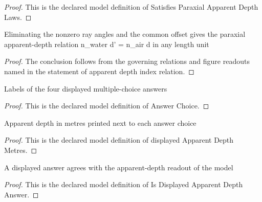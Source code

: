 \begin{proof}
  This is the declared model definition of Satisfies Paraxial Apparent Depth Laws.
\end{proof}
\begin{lemma}
  \label{lem:physics:phyx-mini-0137:phyxminiproblems-problemphyxmini0137-apparent-depth-index-relation}
  Eliminating the nonzero ray angles and the common offset gives the paraxial apparent-depth relation n\_water d' = n\_air d in any length unit
\end{lemma}
\begin{proof}
  The conclusion follows from the governing relations and figure readouts named in the statement of apparent depth index relation.
\end{proof}
\begin{definition}
  \label{def:physics:phyx-mini-0137:phyxminiproblems-problemphyxmini0137-answerchoice}
  Labels of the four displayed multiple-choice answers
\end{definition}
\begin{proof}
  This is the declared model definition of Answer Choice.
\end{proof}
\begin{definition}
  \label{def:physics:phyx-mini-0137:phyxminiproblems-problemphyxmini0137-displayedapparentdepthmetres}
  Apparent depth in metres printed next to each answer choice
\end{definition}
\begin{proof}
  This is the declared model definition of displayed Apparent Depth Metres.
\end{proof}
\begin{definition}
  \label{def:physics:phyx-mini-0137:phyxminiproblems-problemphyxmini0137-isdisplayedapparentdepthanswer}
  A displayed answer agrees with the apparent-depth readout of the model
\end{definition}
\begin{proof}
  This is the declared model definition of Is Displayed Apparent Depth Answer.
\end{proof}
